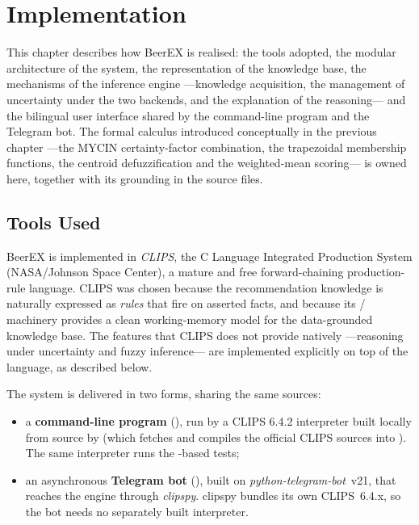 \chapter{Implementation}

This chapter describes how BeerEX is realised: the tools adopted, the modular
architecture of the system, the representation of the knowledge base, the
mechanisms of the inference engine ---knowledge acquisition, the management of
uncertainty under the two backends, and the explanation of the reasoning--- and
the bilingual user interface shared by the command-line program and the Telegram
bot. The formal calculus introduced conceptually in the previous chapter
---the MYCIN certainty-factor combination, the trapezoidal membership functions,
the centroid defuzzification and the weighted-mean scoring--- is owned here,
together with its grounding in the source files.

\section{Tools Used}

BeerEX is implemented in \emph{CLIPS}, the C Language Integrated Production
System (NASA/Johnson Space Center), a mature and free forward-chaining
production-rule language. CLIPS was chosen because the recommendation knowledge
is naturally expressed as \emph{rules} that fire on asserted facts, and because
its / machinery provides a clean working-memory
model for the data-grounded knowledge base. The features that CLIPS does not
provide natively ---reasoning under uncertainty and fuzzy inference--- are
implemented explicitly on top of the language, as described below.

The system is delivered in two forms, sharing the same  sources:

\begin{itemize}[nosep]
  \item a \textbf{command-line program} (), run by a CLIPS
        6.4.2 interpreter built locally from source by 
        (which fetches and compiles the official CLIPS sources into
        ). The same interpreter runs the
        -based tests;
  \item an asynchronous \textbf{Telegram bot} (), built on
        \emph{python-telegram-bot}~v21, that reaches the engine through
        \emph{clipspy}. clipspy bundles its own CLIPS~6.4.x, so the bot needs no
        separately built interpreter.
\end{itemize}

